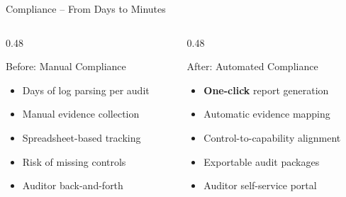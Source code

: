 \begin{frame}{Compliance -- From Days to Minutes}
  \begin{columns}[T]
    \begin{column}{0.48\textwidth}
      \begin{alertblock}{Before: Manual Compliance}
        \scriptsize
        \begin{itemize}
          \item Days of log parsing per audit
          \item Manual evidence collection
          \item Spreadsheet-based tracking
          \item Risk of missing controls
          \item Auditor back-and-forth
        \end{itemize}
      \end{alertblock}
    \end{column}
    \begin{column}{0.48\textwidth}
      \begin{exampleblock}{After: Automated Compliance}
        \scriptsize
        \begin{itemize}
          \item \textbf{One-click} report generation
          \item Automatic evidence mapping
          \item Control-to-capability alignment
          \item Exportable audit packages
          \item Auditor self-service portal
        \end{itemize}
      \end{exampleblock}
    \end{column}
  \end{columns}

  \vspace{0.3cm}


\end{frame}
